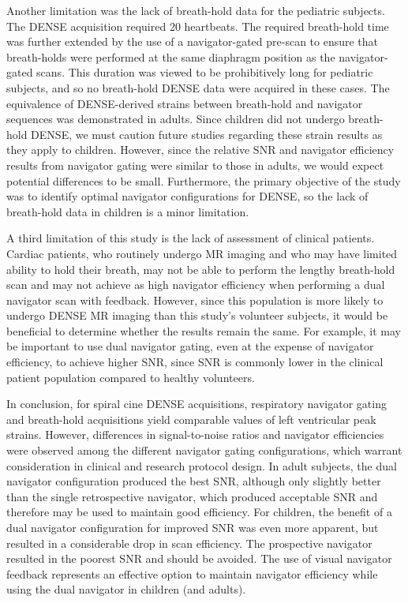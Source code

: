 	Another limitation was the lack of breath-hold data for the pediatric subjects. The DENSE acquisition required 20 heartbeats. The required breath-hold time was further extended by the use of a navigator-gated pre-scan to ensure that breath-holds were performed at the same diaphragm position as the navigator-gated scans. This duration was viewed to be prohibitively long for pediatric subjects, and so no breath-hold DENSE data were acquired in these cases. The equivalence of DENSE-derived strains between breath-hold and navigator sequences was demonstrated in adults. Since children did not undergo breath-hold DENSE, we must caution future studies regarding these strain results as they apply to children. However, since the relative SNR and navigator efficiency results from navigator gating were similar to those in adults, we would expect potential differences to be small. Furthermore, the primary objective of the study was to identify optimal navigator configurations for DENSE, so the lack of breath-hold data in children is a minor limitation.
	
	A third limitation of this study is the lack of assessment of clinical patients. Cardiac patients, who routinely undergo MR imaging and who may have limited ability to hold their breath, may not be able to perform the lengthy breath-hold scan and may not achieve as high navigator efficiency when performing a dual navigator scan with feedback. However, since this population is more likely to undergo DENSE MR imaging than this study's volunteer subjects, it would be beneficial to determine whether the results remain the same. For example, it may be important to use dual navigator gating, even at the expense of navigator efficiency, to achieve higher SNR, since SNR is commonly lower in the clinical patient population compared to healthy volunteers.
	
	In conclusion, for spiral cine DENSE acquisitions, respiratory navigator gating and breath-hold acquisitions yield comparable values of left ventricular peak strains. However, differences in signal-to-noise ratios and navigator efficiencies were observed among the different navigator gating configurations, which warrant consideration in clinical and research protocol design. In adult subjects, the dual navigator configuration produced the best SNR, although only slightly better than the single retrospective navigator, which produced acceptable SNR and therefore may be used to maintain good efficiency. For children, the benefit of a dual navigator configuration for improved SNR was even more apparent, but resulted in a considerable drop in scan efficiency. The prospective navigator resulted in the poorest SNR and should be avoided. The use of visual navigator feedback represents an effective option to maintain navigator efficiency while using the dual navigator in children (and adults).